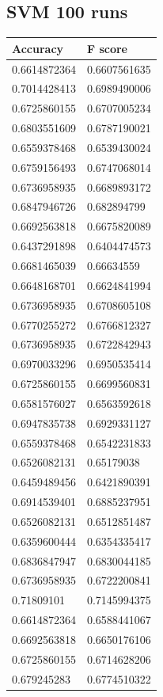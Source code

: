 \subsection{SVM 100 runs}
\begin{longtable}{@{}ll@{}}
	\toprule
	Accuracy     & F score      \\ \midrule
	0.6614872364 & 0.6607561635 \\
	0.7014428413 & 0.6989490006 \\
	0.6725860155 & 0.6707005234 \\
	0.6803551609 & 0.6787190021 \\
	0.6559378468 & 0.6539430024 \\
	0.6759156493 & 0.6747068014 \\
	0.6736958935 & 0.6689893172 \\
	0.6847946726 & 0.682894799  \\
	0.6692563818 & 0.6675820089 \\
	0.6437291898 & 0.6404474573 \\
	0.6681465039 & 0.66634559   \\
	0.6648168701 & 0.6624841994 \\
	0.6736958935 & 0.6708605108 \\
	0.6770255272 & 0.6766812327 \\
	0.6736958935 & 0.6722842943 \\
	0.6970033296 & 0.6950535414 \\
	0.6725860155 & 0.6699560831 \\
	0.6581576027 & 0.6563592618 \\
	0.6947835738 & 0.6929331127 \\
	0.6559378468 & 0.6542231833 \\
	0.6526082131 & 0.65179038   \\
	0.6459489456 & 0.6421890391 \\
	0.6914539401 & 0.6885237951 \\
	0.6526082131 & 0.6512851487 \\
	0.6359600444 & 0.6354335417 \\
	0.6836847947 & 0.6830044185 \\
	0.6736958935 & 0.6722200841 \\
	0.71809101   & 0.7145994375 \\
	0.6614872364 & 0.6588441067 \\
	0.6692563818 & 0.6650176106 \\
	0.6725860155 & 0.6714628206 \\
	0.679245283  & 0.6774510322 \\

\end{longtable}
